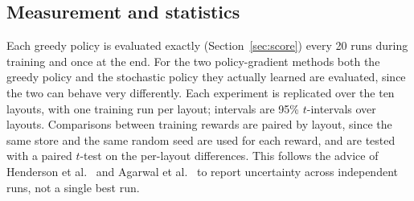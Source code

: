 \subsection{Measurement and statistics}
Each greedy policy is evaluated exactly (Section~\ref{sec:score}) every 20 runs during training and once at the end. For the two policy-gradient methods both the greedy policy and the stochastic policy they actually learned are evaluated, since the two can behave very differently. Each experiment is replicated over the ten layouts, with one training run per layout; intervals are 95\% $t$-intervals over layouts. Comparisons between training rewards are paired by layout, since the same store and the same random seed are used for each reward, and are tested with a paired $t$-test on the per-layout differences. This follows the advice of Henderson et al.~\cite{henderson2018} and Agarwal et al.~\cite{agarwal2021} to report uncertainty across independent runs, not a single best run.
